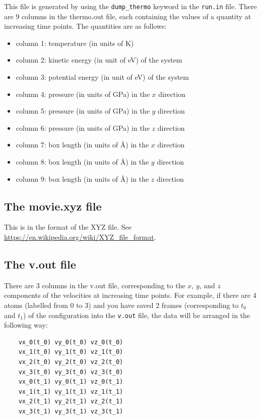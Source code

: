 \documentclass[12pt,a4paper]{report}
\begin{document}
This file is generated by using the \verb"dump_thermo" keyword in the \verb"run.in" file.
There are 9 columns in the thermo.out file, each containing the values of a quantity at increasing time points. The quantities are as follows:
\begin{itemize}
\item column 1: temperature (in units of K)
\item column 2: kinetic energy (in unit of eV) of the system
\item column 3: potential energy (in unit of eV) of the system
\item column 4: pressure (in units of GPa) in the $x$ direction
\item column 5: pressure (in units of GPa) in the $y$ direction
\item column 6: pressure (in units of GPa) in the $z$ direction
\item column 7: box length (in units of \AA) in the $x$ direction
\item column 8: box length (in units of \AA) in the $y$ direction
\item column 9: box length (in units of \AA) in the $z$ direction
\end{itemize}


\subsection{The movie.xyz file}

This is in the format of the XYZ file. See \url{https://en.wikipedia.org/wiki/XYZ_file_format}.

\subsection{The v.out file}
There are 3 columns in the v.out file, corresponding to the $x$, $y$, and $z$ components of the velocities at increasing time points. For example, if there are 4 atoms (labelled from 0 to 3) and you have saved 2 frames (corresponding to $t_0$ and $t_1$) of the configuration into the \verb"v.out" file, the data will be arranged in the following way:
\begin{verbatim}
    vx_0(t_0) vy_0(t_0) vz_0(t_0)
    vx_1(t_0) vy_1(t_0) vz_1(t_0)
    vx_2(t_0) vy_2(t_0) vz_2(t_0)
    vx_3(t_0) vy_3(t_0) vz_3(t_0)
    vx_0(t_1) vy_0(t_1) vz_0(t_1)
    vx_1(t_1) vy_1(t_1) vz_1(t_1)
    vx_2(t_1) vy_2(t_1) vz_2(t_1)
    vx_3(t_1) vy_3(t_1) vz_3(t_1)
\end{verbatim}
\end{document}
